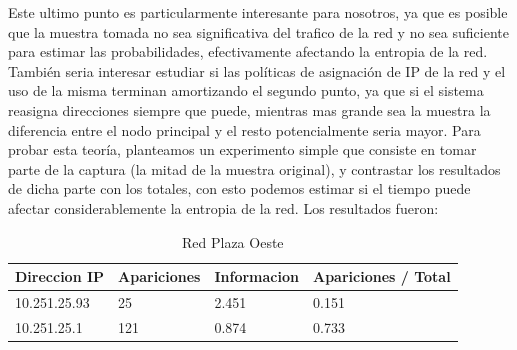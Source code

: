 Este ultimo punto es particularmente interesante para nosotros, ya que es posible que la muestra tomada no sea significativa del trafico de la red y no sea suficiente para estimar las probabilidades, efectivamente afectando la entropia de la red. También seria interesar estudiar si las políticas de asignación de IP de la red y el uso de la misma terminan amortizando el segundo punto, ya que si el sistema reasigna direcciones siempre que puede, mientras mas grande sea la muestra la diferencia entre el nodo principal y el resto potencialmente seria mayor. Para probar esta teoría, planteamos un experimento simple que consiste en tomar parte de la captura (la mitad de la muestra original), y contrastar los resultados de dicha parte con los totales, con esto podemos estimar si el tiempo puede afectar considerablemente la entropia de la red. Los resultados fueron:


\begin{table}[H]
\centering
\caption{Red Plaza Oeste}
\label{my-label}
\begin{tabular}{@{}llll@{}}
\toprule
Direccion IP & Apariciones & Informacion & Apariciones / Total \\ \midrule
10.251.25.93 & 25          & 2.451       & 0.151               \\
10.251.25.1  & 121         & 0.874       & 0.733               \\ \bottomrule
\end{tabular}
\end{table}


